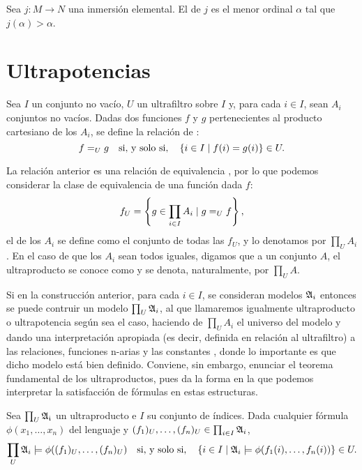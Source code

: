 \begin{defi}
    Sea $j\colon M\to N$ una inmersión elemental. El  de $j$
    es el menor ordinal $\alpha$ tal que $j(\alpha)>\alpha$.
\end{defi}

\section{Ultrapotencias}
Sea $I$ un conjunto no vacío, $U$ un ultrafiltro sobre $I$ y, para cada $i\in I$,
sean $A_i$ conjuntos no vacíos. Dadas dos funciones $f$ y $g$ pertenecientes al producto
cartesiano de los $A_i$, se define la relación de :
\[
    f=_U g \quad\text{si, y solo si,}\quad \left\{ i\in I\mid f(i)=g(i) \right\}\in U.
\]

La relación anterior es una relación de equivalencia \autocite[Proposición 4.1.5]{chang_model_2012},
por lo que podemos considerar la clase de equivalencia de una función dada $f$:
\[
    f_U = \left\{ g\in \prod_{i\in I} A_i\mid g=_U f \right\},
\]
el  de los $A_i$ se define como el conjunto de todas las $f_U$,
y lo denotamos por $\prod_U A_i$. En el caso de que los $A_i$ sean todos iguales, digamos que
a un conjunto $A$, el ultraproducto se conoce como  y se denota, naturalmente,
por $\prod_U A$.

Si en la construcción anterior, para cada $i\in I$, se consideran modelos $\mathfrak { A }_i$ entonces
se puede contruir un modelo $\prod_U \mathfrak { A }_i$, al que llamaremos igualmente
ultraproducto o ultrapotencia según sea el caso,
haciendo de $\prod_U A_i$ el universo del modelo y dando una
interpretación apropiada (es decir, definida en relación al ultrafiltro) a las relaciones,
funciones n-arias y las constantes \autocite[Teorema 4.1.6]{chang_model_2012}, donde lo importante es que
dicho modelo está bien definido. Conviene, sin embargo, enunciar el teorema fundamental de los
ultraproductos, pues da la forma en la que podemos interpretar la satisfacción de fórmulas
en estas estructuras.
\begin{teo}\label{teo:ultraprod-fundamental}
    Sea $\prod_U \mathfrak { A_i }$ un ultraproducto e $I$ su conjunto de índices.
    Dada cualquier fórmula $\phi(x_1,\dots,x_n)$ del lenguaje y $(f_1)_U,\dots,(f_n)_U\in\prod_{i\in I} \mathfrak { A }_i$,
    \[
        \prod_U \mathfrak { A }_i\models\phi((f_1)_U,\dots,(f_n)_U)
        \quad\text{si, y solo si,}\quad
        \left\{ i\in I\mid \mathfrak { A }_i\models\phi(f_1(i),\dots,f_n(i)) \right\}\in U.
    \]
\end{teo}

